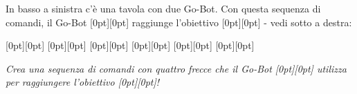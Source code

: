 {In basso a sinistra c’è una tavola con due Go-Bot.
Con questa sequenza di comandi, il Go-Bot \raisebox{-0.5ex}[0pt][0pt]{} raggiunge l’obiettivo \raisebox{-0.5ex}[0pt][0pt]{} - vedi sotto a destra:

{\centering%
\raisebox{-0.5ex}[0pt][0pt]{} \raisebox{-0.5ex}[0pt][0pt]{} \raisebox{-0.5ex}[0pt][0pt]{} \raisebox{-0.5ex}[0pt][0pt]{} \raisebox{-0.5ex}[0pt][0pt]{} \raisebox{-0.5ex}[0pt][0pt]{}

{\centering%
\par}\par}



{\em
Crea una sequenza di comandi con quattro frecce che il Go-Bot \raisebox{-0.5ex}[0pt][0pt]{} utilizza per raggiungere l’obiettivo \raisebox{-0.5ex}[0pt][0pt]{}!

{\centering%
{\centering%
\par}

{\centering%
\par}\par}


}



}
